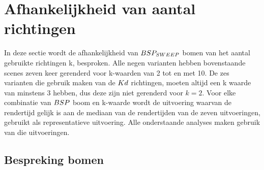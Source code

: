 \section{Afhankelijkheid van aantal richtingen}
In deze sectie wordt de afhankelijkheid van $BSP_{SWEEP}$ bomen van het aantal gebruikte richtingen k, besproken. 
Alle negen varianten hebben bovenstaande scenes zeven keer gerenderd voor k-waarden van 2 tot en met 10.
De zes varianten die gebruik maken van de $Kd$ richtingen, moeten altijd een k waarde van minstens 3 hebben, dus deze zijn niet gerenderd voor $k = 2$.
Voor elke combinatie van $BSP$ boom en k-waarde wordt de uitvoering waarvan de rendertijd gelijk is aan de mediaan van de rendertijden van de zeven uitvoeringen, gebruikt als representatieve uitvoering.
Alle onderstaande analyses maken gebruik van die uitvoeringen.\\
\subsection{Bespreking bomen}
\label{h5-richtingen-bespreking}
